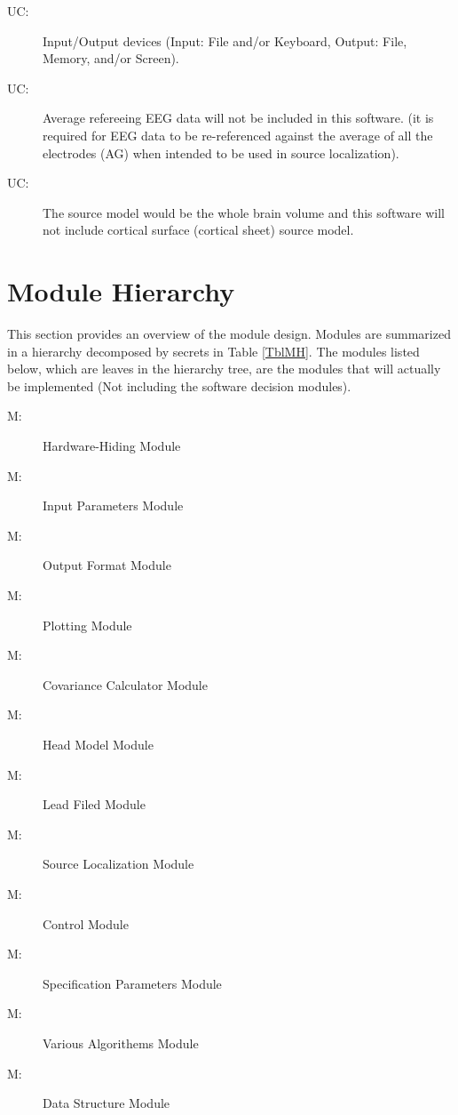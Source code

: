 \documentclass[12pt, titlepage]{article}
\newcounter{ucnum}
\newcommand{\uctheucnum}{UC\theucnum}
\newcounter{mnum}
\newcommand{\mthemnum}{M\themnum}
\begin{document}
\begin{description}
\item[ \uctheucnum \label{ucIO}:] Input/Output devices
  (Input: File and/or Keyboard, Output: File, Memory, and/or Screen).
\item[ \uctheucnum \label{ucSM}:] Average refereeing EEG data will not be included in this software. (it is required for EEG data to be re-referenced against the average of all the electrodes (AG) when intended to be used in source localization).
\item[ \uctheucnum \label{ucSM}:] The source model would be the whole brain volume and this software will not include cortical surface (cortical sheet) source model.
\end{description}

\section{Module Hierarchy} \label{SecMH}

This section provides an overview of the module design. Modules are summarized
in a hierarchy decomposed by secrets in Table \ref{TblMH}. The modules listed
below, which are leaves in the hierarchy tree, are the modules that will
actually be implemented (Not including the software decision modules).

\begin{description}
\item [ \mthemnum \label{mHH}:] Hardware-Hiding Module
\item [ \mthemnum \label{mIP}:] Input Parameters Module
\item [ \mthemnum \label{mOP}:] Output Format Module
\item [ \mthemnum \label{mP}:] Plotting Module
\item [ \mthemnum \label{mCov}:]  Covariance Calculator Module
\item [ \mthemnum \label{mHM}:] Head Model Module
\item [ \mthemnum \label{mLF}:] Lead Filed Module
\item [ \mthemnum \label{mSL}:] Source Localization Module
\item [ \mthemnum \label{mCtrl}:] Control Module
\item [ \mthemnum \label{mSpec}:] Specification Parameters Module
\item [ \mthemnum \label{mAlg}:] Various Algorithems Module
\item [ \mthemnum \label{mDS}:] Data Structure Module

\end{description}
\end{document}
